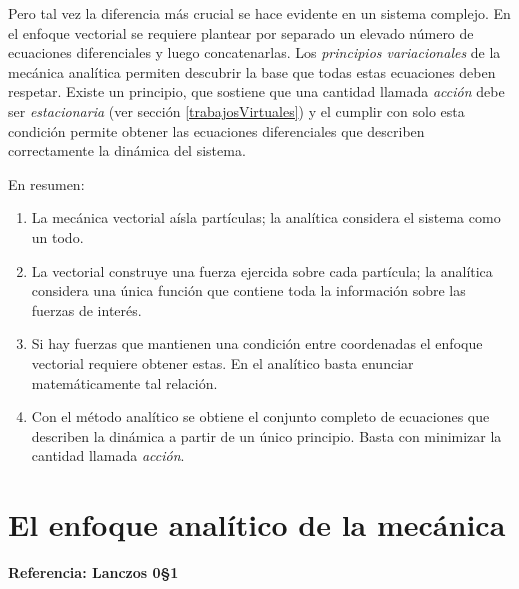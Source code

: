 \documentclass[12pt, spanish, a4paper, ]{article}
\begin{document}
Pero tal vez la diferencia más crucial se hace evidente en un sistema complejo.
En el enfoque vectorial se requiere plantear por separado un elevado número de ecuaciones diferenciales y luego concatenarlas.
Los \emph{principios variacionales} de la mecánica analítica permiten descubrir la base que todas estas ecuaciones deben respetar.
Existe un principio, que sostiene que una cantidad llamada \emph{acción} debe ser \emph{estacionaria} (ver sección \ref{trabajosVirtuales}) y el cumplir con solo esta condición permite obtener las ecuaciones diferenciales que describen correctamente la dinámica del sistema.

En resumen:
\begin{enumerate}
	\item La mecánica vectorial aísla partículas; la analítica considera el sistema como un todo.
	\item La vectorial construye una fuerza ejercida sobre cada partícula; la analítica considera una única función que contiene toda la información sobre las fuerzas de interés.
	\item Si hay fuerzas que mantienen una condición entre coordenadas el enfoque vectorial requiere obtener estas. En el analítico basta enunciar matemáticamente tal relación.
	\item Con el método analítico se obtiene el conjunto completo de ecuaciones que describen la dinámica a partir de un único principio. Basta con minimizar la cantidad llamada \emph{acción}. 
\end{enumerate}




\section{El enfoque analítico de la mecánica }
\textbf{Referencia: Lanczos 0\S1}\\
\end{document}
